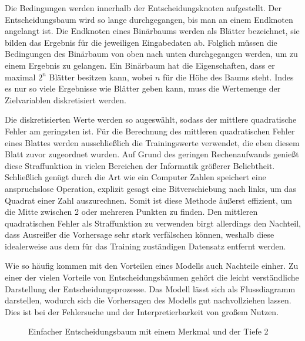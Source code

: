 \documentclass[12pt, a4paper]{article}
\begin{document}
Die Bedingungen werden innerhalb der Entscheidungsknoten aufgestellt. Der Entscheidungsbaum wird so lange durchgegangen, bis man an einem Endknoten angelangt ist. Die Endknoten eines Binärbaums werden als Blätter bezeichnet, sie bilden das Ergebnis für die jeweiligen Eingabedaten ab. Folglich müssen die Bedingungen des Binärbaum von oben nach unten durchgegangen werden, um zu einem Ergebnis zu gelangen. Ein Binärbaum hat die Eigenschaften, dass er maximal $2^{n}$ Blätter besitzen kann, wobei $n$ für die Höhe des Baums steht. Indes es nur so viele Ergebnisse wie Blätter geben kann, muss die Wertemenge der Zielvariablen diskretisiert werden. 

Die diskretisierten Werte werden so augeswählt, sodass der mittlere quadratische Fehler am geringsten ist. Für die Berechnung des mittleren quadratischen Fehler eines Blattes werden ausschließlich die Trainingswerte verwendet, die eben diesem Blatt zuvor zugeordnet wurden. Auf Grund des geringen Rechenaufwands genießt diese Straffunktion in vielen Bereichen der Informatik größerer Beliebtheit. Schließlich genügt durch die Art wie ein Computer Zahlen speichert eine anspruchslose Operation, explizit gesagt eine Bitverschiebung nach links, um das Quadrat einer Zahl auszurechnen. Somit ist diese Methode äußerst effizient, um die Mitte zwischen 2 oder mehreren Punkten zu finden. Den mittleren quadratischen Fehler als Straffunktion zu verwenden birgt allerdings den Nachteil, dass Ausreißer die Vorhersage sehr stark verfälschen können, weshalb diese idealerweise aus dem für das Training zuständigen Datensatz entfernt werden.



Wie so häufig kommen mit den Vorteilen eines Modells auch Nachteile einher. Zu einer der vielen Vorteile von Entscheidungsbäumen gehört die leicht verständliche Darstellung der Entscheidungsprozesse. Das Modell lässt sich als Flussdiagramm darstellen, wodurch sich die Vorhersagen des Modells gut nachvollziehen lassen. Dies ist bei der Fehlersuche und der Interpretierbarkeit von großem Nutzen.

\begin{figure}
\centering
\def\svgwidth{350pt}

\caption{Einfacher Entscheidungsbaum mit einem Merkmal und der Tiefe 2}
\label{fig:decisiontree_linear}
\end {figure}
\end{document}
